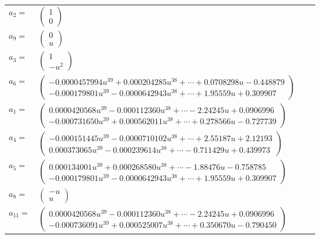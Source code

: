 \documentclass[1p]{elsarticle_modified}
\theoremstyle{definition}
\begin{document}
\begin{tabular}{m{7pt} m{180pt} m{7pt} m{180pt} }
\flushright $a_{2}=$&$\begin{pmatrix}1\\0\end{pmatrix}$ \\
\flushright $a_{9}=$&$\begin{pmatrix}0\\u\end{pmatrix}$ \\
\flushright $a_{3}=$&$\begin{pmatrix}1\\- u^2\end{pmatrix}$ \\
\flushright $a_{6}=$&$\begin{pmatrix}-0.0000457994 u^{39}+0.000204285 u^{38}+\cdots+0.0708298 u-0.448879\\-0.000179801 u^{39}-0.0000642943 u^{38}+\cdots+1.95559 u+0.309907\end{pmatrix}$ \\
\flushright $a_{1}=$&$\begin{pmatrix}0.0000420568 u^{39}-0.000112360 u^{38}+\cdots-2.24245 u+0.0906996\\-0.000731650 u^{39}+0.000562011 u^{38}+\cdots+0.278566 u-0.727739\end{pmatrix}$ \\
\flushright $a_{4}=$&$\begin{pmatrix}-0.000151445 u^{39}-0.0000710102 u^{38}+\cdots+2.55187 u+2.12193\\0.000373065 u^{39}-0.000239614 u^{38}+\cdots-0.711429 u+0.439973\end{pmatrix}$ \\
\flushright $a_{5}=$&$\begin{pmatrix}0.000134001 u^{39}+0.000268580 u^{38}+\cdots-1.88476 u-0.758785\\-0.000179801 u^{39}-0.0000642943 u^{38}+\cdots+1.95559 u+0.309907\end{pmatrix}$ \\
\flushright $a_{8}=$&$\begin{pmatrix}- u\\u\end{pmatrix}$ \\
\flushright $a_{11}=$&$\begin{pmatrix}0.0000420568 u^{39}-0.000112360 u^{38}+\cdots-2.24245 u+0.0906996\\-0.000736091 u^{39}+0.000525007 u^{38}+\cdots+0.350670 u-0.790450\end{pmatrix}$ \\

\end{tabular}
\end{document}
